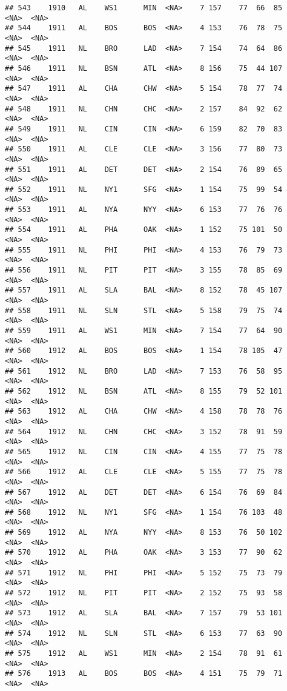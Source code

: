 \documentclass[]{article}
\begin{document}
\begin{verbatim}
## 543    1910   AL    WS1      MIN  <NA>    7 157    77  66  85   <NA>  <NA>
## 544    1911   AL    BOS      BOS  <NA>    4 153    76  78  75   <NA>  <NA>
## 545    1911   NL    BRO      LAD  <NA>    7 154    74  64  86   <NA>  <NA>
## 546    1911   NL    BSN      ATL  <NA>    8 156    75  44 107   <NA>  <NA>
## 547    1911   AL    CHA      CHW  <NA>    5 154    78  77  74   <NA>  <NA>
## 548    1911   NL    CHN      CHC  <NA>    2 157    84  92  62   <NA>  <NA>
## 549    1911   NL    CIN      CIN  <NA>    6 159    82  70  83   <NA>  <NA>
## 550    1911   AL    CLE      CLE  <NA>    3 156    77  80  73   <NA>  <NA>
## 551    1911   AL    DET      DET  <NA>    2 154    76  89  65   <NA>  <NA>
## 552    1911   NL    NY1      SFG  <NA>    1 154    75  99  54   <NA>  <NA>
## 553    1911   AL    NYA      NYY  <NA>    6 153    77  76  76   <NA>  <NA>
## 554    1911   AL    PHA      OAK  <NA>    1 152    75 101  50   <NA>  <NA>
## 555    1911   NL    PHI      PHI  <NA>    4 153    76  79  73   <NA>  <NA>
## 556    1911   NL    PIT      PIT  <NA>    3 155    78  85  69   <NA>  <NA>
## 557    1911   AL    SLA      BAL  <NA>    8 152    78  45 107   <NA>  <NA>
## 558    1911   NL    SLN      STL  <NA>    5 158    79  75  74   <NA>  <NA>
## 559    1911   AL    WS1      MIN  <NA>    7 154    77  64  90   <NA>  <NA>
## 560    1912   AL    BOS      BOS  <NA>    1 154    78 105  47   <NA>  <NA>
## 561    1912   NL    BRO      LAD  <NA>    7 153    76  58  95   <NA>  <NA>
## 562    1912   NL    BSN      ATL  <NA>    8 155    79  52 101   <NA>  <NA>
## 563    1912   AL    CHA      CHW  <NA>    4 158    78  78  76   <NA>  <NA>
## 564    1912   NL    CHN      CHC  <NA>    3 152    78  91  59   <NA>  <NA>
## 565    1912   NL    CIN      CIN  <NA>    4 155    77  75  78   <NA>  <NA>
## 566    1912   AL    CLE      CLE  <NA>    5 155    77  75  78   <NA>  <NA>
## 567    1912   AL    DET      DET  <NA>    6 154    76  69  84   <NA>  <NA>
## 568    1912   NL    NY1      SFG  <NA>    1 154    76 103  48   <NA>  <NA>
## 569    1912   AL    NYA      NYY  <NA>    8 153    76  50 102   <NA>  <NA>
## 570    1912   AL    PHA      OAK  <NA>    3 153    77  90  62   <NA>  <NA>
## 571    1912   NL    PHI      PHI  <NA>    5 152    75  73  79   <NA>  <NA>
## 572    1912   NL    PIT      PIT  <NA>    2 152    75  93  58   <NA>  <NA>
## 573    1912   AL    SLA      BAL  <NA>    7 157    79  53 101   <NA>  <NA>
## 574    1912   NL    SLN      STL  <NA>    6 153    77  63  90   <NA>  <NA>
## 575    1912   AL    WS1      MIN  <NA>    2 154    78  91  61   <NA>  <NA>
## 576    1913   AL    BOS      BOS  <NA>    4 151    75  79  71   <NA>  <NA>

\end{verbatim}
\end{document}
